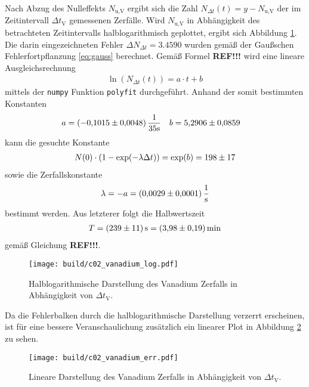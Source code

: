 \noindent
Nach Abzug des Nulleffekts $N_\text{u,V}$ ergibt sich die Zahl $N_{\Delta t}(t) = y- N_\text{u,V}$ der im Zeitintervall $\Delta t_\text{V}$
gemessenen Zerfälle.
Wird $N_\text{u,V}$ in Abhängigkeit des betrachteten Zeitintervalls halblogarithmisch geplottet, ergibt sich Abbildung \ref{fig:vanadium_log}.
Die darin eingezeichneten Fehler $\Delta N_{\Delta t} = \num[]{3.4590}$ wurden gemäß der Gaußschen Fehlerfortpflanzung \eqref{eq:gauss} berechnet.
Gemäß Formel \textbf{REF!!!} wird eine lineare Ausgleichsrechnung 
\begin{align}
    \ln\left(N_{\Delta t}(t)\right) = a \cdot t + b
\end{align}
mittels der \texttt{numpy} \cite[]{numpy} Funktion \texttt{polyfit} durchgeführt.
Anhand der somit bestimmten Konstanten
\begin{align*}
    a &= (\num{-0.1015 +- 0.0048}) \, \frac{1}{35 \unit{\second}}  & b &= \num{5.2906 +- 0.0859}
\end{align*}
kann die gesuchte Konstante 
\begin{align}
    N(0) \cdot \left(1- \exp(- \lambda \Delta t)\right) = \exp(b) = \num[]{198 +- 17}
\end{align}
sowie die Zerfallskonstante 
\begin{align}
    \lambda = - a = \qty[]{0.0029+-0.0001}{\per\second}
\end{align}
bestimmt werden.
Aus letzterer folgt die Halbwertszeit 
\begin{align}
    T = \qty[]{239 +- 11}{\second} = \qty[]{3.98 +- 0.19}{\minute}
\end{align}
gemäß Gleichung \textbf{REF!!!}.

\begin{figure}[H]
    \centering
    \texttt{[image: build/c02\_vanadium\_log.pdf]}
    \caption[]{Halblogarithmische Darstellung des Vanadium Zerfalls in Abhängigkeit von $\Delta t_\text{V}$.}
    \label{fig:vanadium_log}
\end{figure}

\noindent
Da die Fehlerbalken durch die halblogarithmische Darstellung verzerrt erscheinen, ist für eine bessere Veranschaulichung zusätzlich ein linearer
Plot in Abbildung \ref{fig:vanadium_err} zu sehen.
\begin{figure}[H]
    \centering
    \texttt{[image: build/c02\_vanadium\_err.pdf]}
    \caption[]{Lineare Darstellung des Vanadium Zerfalls in Abhängigkeit von $\Delta t_\text{V}$.}
    \label{fig:vanadium_err}
\end{figure}












